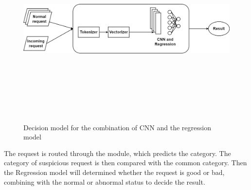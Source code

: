\begin{figure}[ht]
     \centering
     \includegraphics[width=\linewidth, height=10cm,keepaspectratio]{figures/decision model.png}
   \caption{Decision model for the combination of CNN and the regression model}
\end{figure}

The request is routed through the module, which predicts the category. The category of suspicious request is then compared with the common category. Then the Regression model will determined whether the request is good or bad, combining with the normal or abnormal status to decide the result. 
